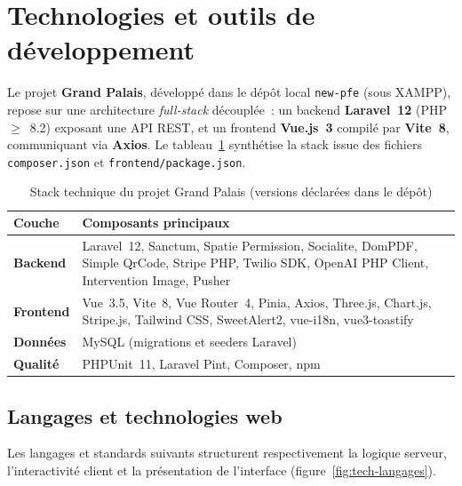 \documentclass[12pt, a4paper]{report}
\begin{document}
\section{Technologies et outils de développement}

Le projet \textbf{Grand Palais}, développé dans le dépôt local \texttt{new-pfe}
(sous XAMPP), repose sur une architecture \emph{full-stack} découplée~: un backend \textbf{Laravel~12}
(PHP~$\geq$~8.2) exposant une API REST, et un frontend \textbf{Vue.js~3} compilé par
\textbf{Vite~8}, communiquant via \textbf{Axios}. Le tableau~\ref{tab:stack} synthétise
la stack issue des fichiers \texttt{composer.json} et \texttt{frontend/package.json}.

\begin{table}[H]
  \centering
  \caption{Stack technique du projet Grand Palais (versions déclarées dans le dépôt)}
  \label{tab:stack}
  \renewcommand{\arraystretch}{1.15}
  \small
  \begin{tabularx}{\textwidth}{>{\bfseries}l X}
    \toprule
    Couche & Composants principaux \\
    \midrule
    Backend &
      Laravel~12, Sanctum, Spatie Permission, Socialite, DomPDF, Simple QrCode,
      Stripe PHP, Twilio SDK, OpenAI PHP Client, Intervention Image, Pusher \\
    Frontend &
      Vue~3.5, Vite~8, Vue Router~4, Pinia, Axios, Three.js, Chart.js, Stripe.js,
      Tailwind CSS, SweetAlert2, vue-i18n, vue3-toastify \\
    Données &
      MySQL (migrations et seeders Laravel) \\
    Qualité &
      PHPUnit~11, Laravel Pint, Composer, npm \\
    \bottomrule
  \end{tabularx}
\end{table}

\subsection{Langages et technologies web}

Les langages et standards suivants structurent respectivement la logique serveur,
l'interactivité client et la présentation de l'interface (figure~\ref{fig:tech-langages}).
\end{document}
